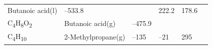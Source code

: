 \documentclass[
]{book}
\theoremstyle{definition}
\theoremstyle{definition}
\theoremstyle{definition}
\theoremstyle{remark}
\begin{document}
\begin{longtable}[]{@{}llllll@{}}
\begin{minipage}[t]{0.17\columnwidth}
Butanoic acid(l)\strut
\end{minipage} & \begin{minipage}[t]{0.15\columnwidth}\raggedright
--533.8\strut
\end{minipage} & \begin{minipage}[t]{0.15\columnwidth}\raggedright
\strut
\end{minipage} & \begin{minipage}[t]{0.14\columnwidth}\raggedright
222.2\strut
\end{minipage} & \begin{minipage}[t]{0.14\columnwidth}\raggedright
178.6\strut
\end{minipage}\tabularnewline
\begin{minipage}[t]{0.07\columnwidth}\raggedright
C\textsubscript{4}H\textsubscript{8}O\textsubscript{2}\strut
\end{minipage} & \begin{minipage}[t]{0.17\columnwidth}\raggedright
Butanoic acid(g)\strut
\end{minipage} & \begin{minipage}[t]{0.15\columnwidth}\raggedright
--475.9\strut
\end{minipage} & \begin{minipage}[t]{0.15\columnwidth}\raggedright
\strut
\end{minipage} & \begin{minipage}[t]{0.14\columnwidth}\raggedright
\strut
\end{minipage} & \begin{minipage}[t]{0.14\columnwidth}\raggedright
\strut
\end{minipage}\tabularnewline
\begin{minipage}[t]{0.07\columnwidth}\raggedright
C\textsubscript{4}H\textsubscript{10}\strut
\end{minipage} & \begin{minipage}[t]{0.17\columnwidth}\raggedright
2-Methylpropane(g)\strut
\end{minipage} & \begin{minipage}[t]{0.15\columnwidth}\raggedright
--135\strut
\end{minipage} & \begin{minipage}[t]{0.15\columnwidth}\raggedright
--21\strut
\end{minipage} & \begin{minipage}[t]{0.14\columnwidth}\raggedright
295\strut
\end{minipage} & \begin{minipage}[t]{0.14\columnwidth}\raggedright

\end{minipage}
\end{longtable}
\end{document}
